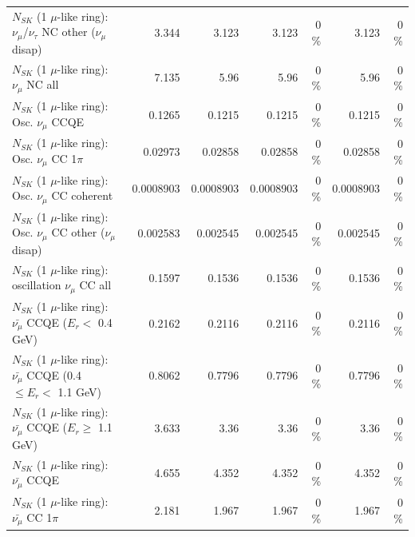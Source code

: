 \begin{table}
\begin{tabular}{| l | r | r | r  r | r  r |}
   $N_{SK}$ (1 $\mu$-like ring): $\nu_\mu$/$\nu_\tau$ NC other ($\nu_\mu$ disap) &           3.344 &           3.123 &           3.123 &        0 \%  &           3.123 &        0 \%  \\ 
                                $N_{SK}$ (1 $\mu$-like ring): $\nu_{\mu}$ NC all &           7.135 &            5.96 &            5.96 &        0 \%  &            5.96 &        0 \%  \\ 
\hline
\hline
                               $N_{SK}$ (1 $\mu$-like ring): Osc. $\nu_\mu$ CCQE &          0.1265 &          0.1215 &          0.1215 &        0 \%  &          0.1215 &        0 \%  \\ 
                          $N_{SK}$ (1 $\mu$-like ring): Osc. $\nu_\mu$ CC 1$\pi$ &         0.02973 &         0.02858 &         0.02858 &        0 \%  &         0.02858 &        0 \%  \\ 
                        $N_{SK}$ (1 $\mu$-like ring): Osc. $\nu_\mu$ CC coherent &       0.0008903 &       0.0008903 &       0.0008903 &        0 \%  &       0.0008903 &        0 \%  \\ 
         $N_{SK}$ (1 $\mu$-like ring): Osc. $\nu_\mu$ CC other ($\nu_\mu$ disap) &        0.002583 &        0.002545 &        0.002545 &        0 \%  &        0.002545 &        0 \%  \\ 
                      $N_{SK}$ (1 $\mu$-like ring): oscillation $\nu_\mu$ CC all &          0.1597 &          0.1536 &          0.1536 &        0 \%  &          0.1536 &        0 \%  \\ 
\hline
\hline
          $N_{SK}$ (1 $\mu$-like ring): $\bar{\nu_\mu}$ CCQE ($E_{r} <$ 0.4 GeV) &          0.2162 &          0.2116 &          0.2116 &        0 \%  &          0.2116 &        0 \%  \\ 
 $N_{SK}$ (1 $\mu$-like ring): $\bar{\nu_\mu}$ CCQE (0.4 $\leq E_{r} <$ 1.1 GeV) &          0.8062 &          0.7796 &          0.7796 &        0 \%  &          0.7796 &        0 \%  \\ 
       $N_{SK}$ (1 $\mu$-like ring): $\bar{\nu_\mu}$ CCQE ($E_{r} \geq$ 1.1 GeV) &           3.633 &            3.36 &            3.36 &        0 \%  &            3.36 &        0 \%  \\ 
\hline
                              $N_{SK}$ (1 $\mu$-like ring): $\bar{\nu_\mu}$ CCQE &           4.655 &           4.352 &           4.352 &        0 \%  &           4.352 &        0 \%  \\ 
                         $N_{SK}$ (1 $\mu$-like ring): $\bar{\nu_\mu}$ CC 1$\pi$ &           2.181 &           1.967 &           1.967 &        0 \%  &           1.967 &        0 \%  \\ 

\end{tabular}
\end{table}
